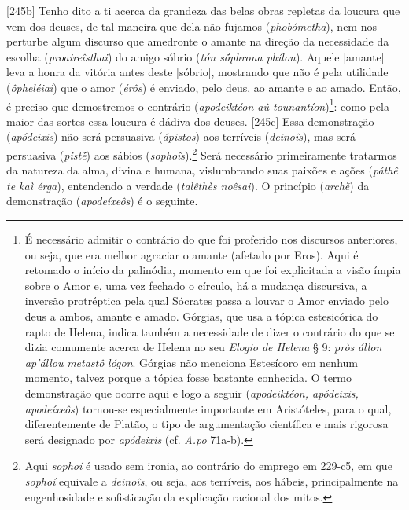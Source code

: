 {[}245b{]} Tenho dito a ti acerca da grandeza das belas obras repletas
da loucura que vem dos deuses, de tal maneira que dela não fujamos
(\emph{phobómetha}), nem nos perturbe algum discurso que amedronte o
amante na direção da necessidade da escolha (\emph{proaireîsthai}) do
amigo sóbrio (\emph{tón sṓphrona phílon}). Aquele {[}amante{]} leva a
honra da vitória antes deste {[}sóbrio{]}, mostrando que não é pela
utilidade (\emph{ôpheléiai}) que o amor (\emph{érôs}) é enviado, pelo
deus, ao amante e ao amado. Então, é preciso que demostremos o contrário
(\emph{apodeiktéon aû tounantíon})\footnote{É necessário admitir o
  contrário do que foi proferido nos discursos anteriores, ou seja, que
  era melhor agraciar o amante (afetado por Eros). Aqui é retomado o
  início da palinódia, momento em que foi explicitada a visão ímpia
  sobre o Amor e, uma vez fechado o círculo, há a mudança discursiva, a
  inversão protréptica pela qual Sócrates passa a louvar o Amor enviado
  pelo deus a ambos, amante e amado. Górgias, que usa a tópica
  estesicórica do rapto de Helena, indica também a necessidade de dizer
  o contrário do que se dizia comumente acerca de Helena no seu
  \emph{Elogio de Helena} § 9: \emph{pròs} \emph{állon} \emph{ap'állou}
  \emph{metastô} \emph{lógon}. Górgias não menciona Estesícoro em nenhum
  momento, talvez porque a tópica fosse bastante conhecida. O termo
  demonstração que ocorre aqui e logo a seguir (\emph{apodeiktéon,
  apódeixis, apodeíxeôs}) tornou-se especialmente importante em
  Aristóteles, para o qual, diferentemente de Platão, o tipo de
  argumentação científica e mais rigorosa será designado por
  \emph{apódeixis} (cf. \emph{A.po} 71a-b).}: como pela maior das sortes
essa loucura é dádiva dos deuses. {[}245c{]} Essa demonstração
(\emph{apódeixis}) não será persuasiva (\emph{ápistos}) aos terríveis
(\emph{deinoîs}), mas será persuasiva (\emph{pistḗ}) aos sábios
(\emph{sophoîs}).\footnote{Aqui \emph{sophoí} é usado sem ironia, ao
  contrário do emprego em 229-c5, em que \emph{sophoí} equivale a
  \emph{deinoîs}, ou seja, aos terríveis, aos hábeis, principalmente na
  engenhosidade e sofisticação da explicação racional dos mitos.} Será
necessário primeiramente tratarmos da natureza da alma, divina e humana,
vislumbrando suas paixões e ações (\emph{páthê te kaì érga}), entendendo
a verdade (\emph{talêthès noêsai}). O princípio (\emph{archḕ}) da
demonstração (\emph{apodeíxeôs}) é o seguinte.

